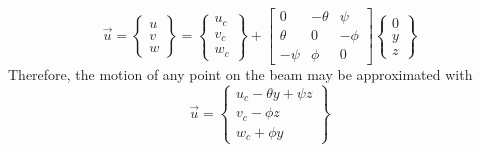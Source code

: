 \begin{equation}\label{DispVectExpanded}
\vec{u} = \left\{\begin{array}{c}
	u\\
	v\\
	w\end{array}\right\}=\left\{\begin{array}{c}
	u_c\\
	v_c\\
	w_c\end{array}\right\}+\left[\begin{array}{ccc}
	0&-\theta&\psi\\
	\theta&0&-\phi\\
	-\psi&\phi&0
	\end{array}\right]\left\{\begin{array}{c}
	0\\
	y\\
	z\end{array}\right\}
\end{equation}
Therefore, the motion of any point on the beam may be approximated with
\begin{equation}\label{eq:DispVectEvaluated}
\vec{u}=\left\{\begin{array}{c}
u_c-\theta y+\psi z\\
v_c-\phi z\\
w_c+\phi y\end{array}\right\}
\end{equation}
